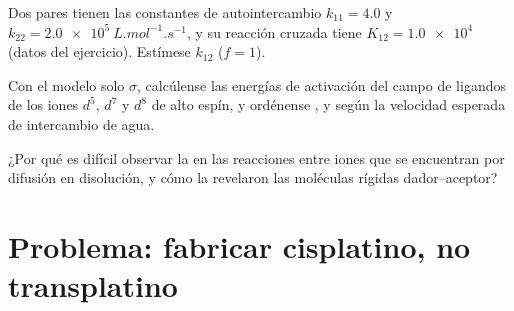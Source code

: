\begin{exercise}[$\star\star\star$]\label{exo:b3:complex-mechanisms:10}
Dos pares tienen las constantes de autointercambio $k_{11} = 4.0$ y $k_{22} = \qty{2.0e5}{L.mol^{-1}.s^{-1}}$, y
su reacción cruzada tiene $K_{12} = \num{1.0e4}$ (datos del ejercicio). Estímese $k_{12}$ ($f = 1$).
\end{exercise}

\begin{exercise}[$\star\star\star$]\label{exo:b3:complex-mechanisms:11}
Con el modelo solo $\sigma$, calcúlense las energías de activación del campo de ligandos de los
iones $d^5$, $d^7$ y $d^8$ de alto espín, y ordénense ,  y  según la velocidad
esperada de intercambio de agua.
\end{exercise}

\begin{exercise}[$\star\star\star$]\label{exo:b3:complex-mechanisms:12}
¿Por qué es difícil observar la  en las reacciones entre iones que
se encuentran por difusión en disolución, y cómo la revelaron las moléculas rígidas dador--aceptor?
\end{exercise}

\section{Problema: fabricar cisplatino, no transplatino}

